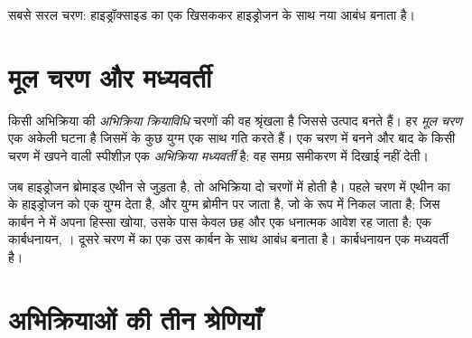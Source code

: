 \begin{omfigure}
\qquad\raisebox{0.2ex}{$+$}\qquad
{}
\qquad\raisebox{0.2ex}{$\longrightarrow$}\qquad
{}

{\small सबसे सरल चरण: हाइड्रॉक्साइड  का एक  खिसककर
हाइड्रोजन  के साथ नया  आबंध बनाता है।}
\end{omfigure}

\section{मूल चरण और मध्यवर्ती}

\begin{definition}\label{def:g12:curly-arrows:mechanism}
किसी अभिक्रिया की \emph{अभिक्रिया क्रियाविधि}
चरणों की वह श्रृंखला है जिससे  उत्पाद बनते हैं। हर
\emph{मूल चरण} एक अकेली घटना है जिसमें
 के कुछ युग्म एक साथ गति करते हैं। एक चरण में बनने और बाद के किसी चरण में
खपने वाली स्पीशीज़ एक \emph{अभिक्रिया मध्यवर्ती} है:
वह समग्र समीकरण में दिखाई नहीं देती।
\end{definition}


\begin{example}\label{ex:g12:curly-arrows:carbocation}
जब हाइड्रोजन ब्रोमाइड एथीन से जुड़ता है, तो अभिक्रिया दो चरणों में होती है।
पहले चरण में एथीन का 
 के हाइड्रोजन को एक युग्म देता है, और  युग्म ब्रोमीन पर जाता है, जो
 के रूप में निकल जाता है; जिस कार्बन ने  में अपना हिस्सा खोया, उसके पास
केवल छह  और एक धनात्मक आवेश रह जाता है: एक कार्बधनायन,
। दूसरे चरण में  का एक  उस कार्बन के साथ
आबंध बनाता है। कार्बधनायन एक मध्यवर्ती है।
\end{example}

\section{अभिक्रियाओं की तीन श्रेणियाँ}

